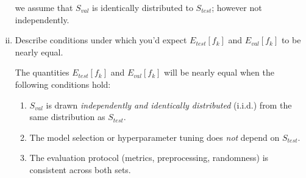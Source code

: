 \documentclass[a4paper]{article}
\begin{document}
\begin{enumerate}[(i)]
we assume that $S_\mathit{val}$ is identically distributed to $S_\mathit{test}$; however not independently.

    \item Describe conditions under which you’d expect $E_\mathit{test}[f_k ]$ and $E_\mathit{val} [f_k]$ to be nearly equal.


    The quantities $E_\mathit{test}[f_k]$ and $E_\mathit{val}[f_k]$ will be nearly equal when the following conditions hold:
    \begin{enumerate}[1.]
        \item $S_\mathit{val}$ is drawn \emph{independently and identically distributed} (i.i.d.) from the same distribution as $S_\mathit{test}$.
        \item The model selection or hyperparameter tuning does \emph{not} depend on $S_\mathit{test}$.
        \item The evaluation protocol (metrics, preprocessing, randomness) is consistent across both sets.
    \end{enumerate}
\end{enumerate}
\end{document}
